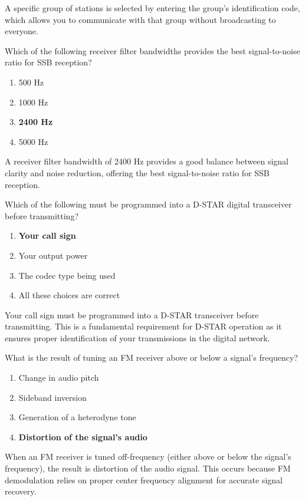 A specific group of stations is selected by entering the group’s identification code, which allows you to communicate with that group without broadcasting to everyone.

\begin{tcolorbox}[colback=gray!10!white,colframe=black!75!black,title={T4B10}]
    Which of the following receiver filter bandwidths provides the best signal-to-noise ratio for SSB reception?
    \begin{enumerate}[label=\Alph*),noitemsep]
        \item 500 Hz
        \item 1000 Hz
        \item \textbf{2400 Hz}
        \item 5000 Hz
    \end{enumerate}
\end{tcolorbox}

A receiver filter bandwidth of 2400 Hz provides a good balance between signal clarity and noise reduction, offering the best signal-to-noise ratio for SSB reception.

\begin{tcolorbox}[colback=gray!10!white,colframe=black!75!black,title={T4B11}]
    Which of the following must be programmed into a D-STAR digital transceiver before transmitting?
    \begin{enumerate}[label=\Alph*),noitemsep]
        \item \textbf{Your call sign}
        \item Your output power
        \item The codec type being used
        \item All these choices are correct
    \end{enumerate}
\end{tcolorbox}

Your call sign must be programmed into a D-STAR transceiver before transmitting. This is a fundamental requirement for D-STAR operation as it ensures proper identification of your transmissions in the digital network.

\begin{tcolorbox}[colback=gray!10!white,colframe=black!75!black,title={T4B12}]
    What is the result of tuning an FM receiver above or below a signal's frequency?
    \begin{enumerate}[label=\Alph*),noitemsep]
        \item Change in audio pitch
        \item Sideband inversion
        \item Generation of a heterodyne tone
        \item \textbf{Distortion of the signal's audio}
    \end{enumerate}
\end{tcolorbox}

When an FM receiver is tuned off-frequency (either above or below the signal's frequency), the result is distortion of the audio signal. This occurs because FM demodulation relies on proper center frequency alignment for accurate signal recovery.
